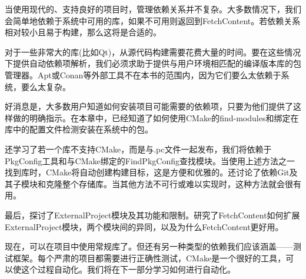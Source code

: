 当使用现代的、支持良好的项目时，管理依赖关系并不复杂。大多数情况下，我们会简单地依赖于系统中可用的库，如果不可用则返回到FetchContent。若依赖关系相对较小且易于构建，那么这将是合适的。

对于一些非常大的库(比如Qt)，从源代码构建需要花费大量的时间。要在这些情况下提供自动依赖项解析，我们必须求助于提供与用户环境相匹配的编译版本库的包管理器。Apt或Conan等外部工具不在本书的范围内，因为它们要么太依赖于系统，要么太复杂。

好消息是，大多数用户知道如何安装项目可能需要的依赖项，只要为他们提供了这样做的明确指示。在本章中，已经知道了如何使用CMake的find-modules和绑定在库中的配置文件检测安装在系统中的包。

还学习了若一个库不支持CMake，而是与.pc文件一起发布，我们将依赖于PkgConfig工具和与CMake绑定的FindPkgConfig查找模块。当使用上述方法之一找到库时，CMake将自动创建构建目标，这是方便和优雅的。还讨论了依赖Git及其子模块和克隆整个存储库。当其他方法不可行或难以实现时，这种方法就会很有用。

最后，探讨了ExternalProject模块及其功能和限制。研究了FetchContent如何扩展ExternalProject模块，两个模块间的异同，以及为什么FetchContent更好用。

现在，可以在项目中使用常规库了。但还有另一种类型的依赖我们应该涵盖——测试框架。每个严肃的项目都需要进行正确性测试，CMake是一个很好的工具，可以使这个过程自动化。我们将在下一部分学习如何进行自动化。






























